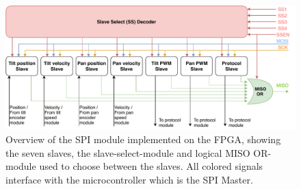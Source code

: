 \documentclass[../../main.tex]{subfiles}
\begin{document}
\begin{figure}[]
    \centering
    \includegraphics[width=\textwidth]{Sections/System_Implementation/Images/SPILogicSimple.pdf}
    \caption{Overview of the SPI module implemented on the FPGA, showing the seven slaves, the slave-select-module and logical MISO OR-module used to choose between the slaves. All colored signals interface with the microcontroller which is the SPI Master. } %
    \label{fig:SPILogicSimple}
\end{figure}




\end{document}

